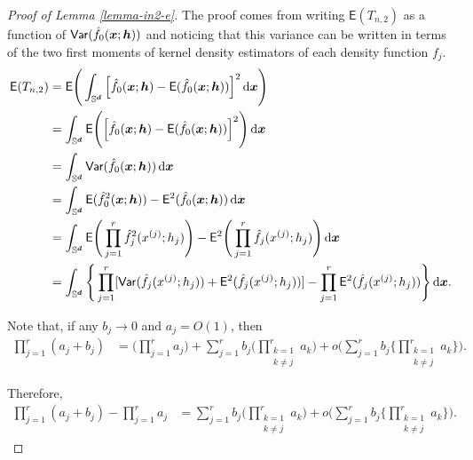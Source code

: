 \documentclass[oneside,11pt]{article}
\begin{document}
\begin{proof}[Proof of Lemma \ref{lemma-in2-e}]
    The proof comes from writing $\mathsf{E} (T_{n,2})$ as a function of $\mathsf{Var} (\hat{f}_{0}(\boldsymbol{x};{\boldsymbol{h}}))$ and noticing that this variance can be written in terms of the two first moments of kernel density estimators of each density function $f_j$.
\begin{align*}
        \mathsf{E} (T_{n,2}) &= \mathsf{E} \Bigg( \int_{\mathbb{S}^{\boldsymbol{d}}} \Big[ \hat{f}_{0}(\boldsymbol{x};{\boldsymbol{h}}) - \mathsf{E} (\hat{f}_{0}(\boldsymbol{x};{\boldsymbol{h}})) \Big]^2 \,\mathrm{d} \boldsymbol{x} \Bigg) \\
        &= \int_{\mathbb{S}^{\boldsymbol{d}}} \mathsf{E} \Bigg( \Big[ \hat{f}_{0}(\boldsymbol{x};{\boldsymbol{h}}) - \mathsf{E} (\hat{f}_{0}(\boldsymbol{x};{\boldsymbol{h}})) \Big]^2 \Bigg) \,\mathrm{d} \boldsymbol{x} \\
        &= \int_{\mathbb{S}^{\boldsymbol{d}}} \mathsf{Var} (\hat{f}_{0}(\boldsymbol{x};{\boldsymbol{h}})) \,\mathrm{d} \boldsymbol{x} \\
        &= \int_{\mathbb{S}^{\boldsymbol{d}}} \mathsf{E} (\hat{f}_{0}^2(\boldsymbol{x};{\boldsymbol{h}})) - \mathsf{E}^2 (\hat{f}_{0}(\boldsymbol{x};{\boldsymbol{h}})) \,\mathrm{d} \boldsymbol{x} \\
        &= \int_{\mathbb{S}^{\boldsymbol{d}}} \mathsf{E} \Bigg(\prod_{j=1}^r \hat{f}_{j}^2(x^{(j)};h_j)\Bigg) - \mathsf{E}^2 \Bigg(\prod_{j=1}^r \hat{f}_{j}(x^{(j)};h_j)\Bigg) \,\mathrm{d} \boldsymbol{x} \\
        &= \int_{\mathbb{S}^{\boldsymbol{d}}} \Bigg\{ \prod_{j=1}^{r} [\mathsf{Var} (\hat{f}_j(x^{(j)};h_j)) + \mathsf{E}^2 (\hat{f}_j(x^{(j)};h_j))] - \prod_{j=1}^{r} \mathsf{E}^2 (\hat{f}_j(x^{(j)};h_j)) \Bigg\} \,\mathrm{d} \boldsymbol{x}.
    \end{align*}

Note that, if any $b_j \to 0$ and $a_j = O(1)$, then
\begin{align*}
    \prod_{j=1}^r (a_j + b_j) &= \Bigg( \prod_{j=1}^{r} a_j\Bigg) + \sum_{j=1}^{r} b_j \Bigg( \prod_{\substack{k=1\\k\neq j}}^r a_k \Bigg) + o \Bigg( \sum_{j=1}^{r} b_j \Bigg\{ \prod_{\substack{k=1\\k\neq j}}^r a_k\Bigg\}\Bigg).
\end{align*}

Therefore,
\begin{align*}
    \prod_{j=1}^r (a_j + b_j) -  \prod_{j=1}^r a_j &= \sum_{j=1}^{r} b_j \Bigg( \prod_{\substack{k=1\\k\neq j}}^r a_k \Bigg) + o \Bigg( \sum_{j=1}^{r} b_j \Bigg\{ \prod_{\substack{k=1\\k\neq j}}^r a_k \Bigg\}\Bigg).
\end{align*}


\end{proof}
\end{document}
